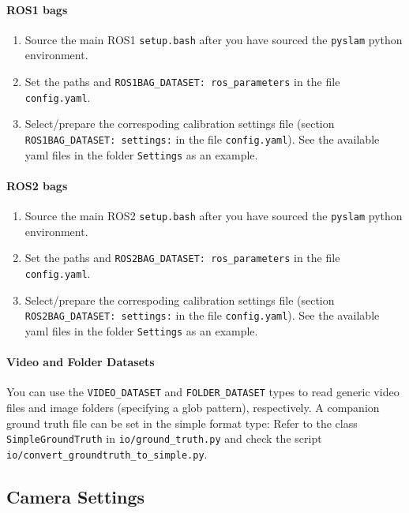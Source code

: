 \documentclass{article}
\providecommand{\tightlist}{%
  \setlength{\itemsep}{0pt}\setlength{\parskip}{0pt}}
\let\oldparagraph\paragraph
\renewcommand{\paragraph}[1]{\oldparagraph{#1}\mbox{}}
\begin{document}
\hypertarget{ros1-bags}{%
\paragraph{ROS1 bags}\label{ros1-bags}}

\begin{enumerate}
\def\labelenumi{\arabic{enumi}.}
\tightlist
\item
  Source the main ROS1 \texttt{setup.bash} after you have sourced the
  \texttt{pyslam} python environment.
\item
  Set the paths and \texttt{ROS1BAG\_DATASET:\ ros\_parameters} in the
  file \texttt{config.yaml}.
\item
  Select/prepare the correspoding calibration settings file (section
  \texttt{ROS1BAG\_DATASET:\ settings:} in the file
  \texttt{config.yaml}). See the available yaml files in the folder
  \texttt{Settings} as an example.
\end{enumerate}

\hypertarget{ros2-bags}{%
\paragraph{ROS2 bags}\label{ros2-bags}}

\begin{enumerate}
\def\labelenumi{\arabic{enumi}.}
\tightlist
\item
  Source the main ROS2 \texttt{setup.bash} after you have sourced the
  \texttt{pyslam} python environment.
\item
  Set the paths and \texttt{ROS2BAG\_DATASET:\ ros\_parameters} in the
  file \texttt{config.yaml}.
\item
  Select/prepare the correspoding calibration settings file (section
  \texttt{ROS2BAG\_DATASET:\ settings:} in the file
  \texttt{config.yaml}). See the available yaml files in the folder
  \texttt{Settings} as an example.
\end{enumerate}

\hypertarget{video-and-folder-datasets}{%
\paragraph{Video and Folder Datasets}\label{video-and-folder-datasets}}

You can use the \texttt{VIDEO\_DATASET} and \texttt{FOLDER\_DATASET}
types to read generic video files and image folders (specifying a glob
pattern), respectively. A companion ground truth file can be set in the
simple format type: Refer to the class \texttt{SimpleGroundTruth} in
\texttt{io/ground\_truth.py} and check the script
\texttt{io/convert\_groundtruth\_to\_simple.py}.
\hypertarget{camera-settings}{%
\subsection{Camera Settings}\label{camera-settings}}
\end{document}
